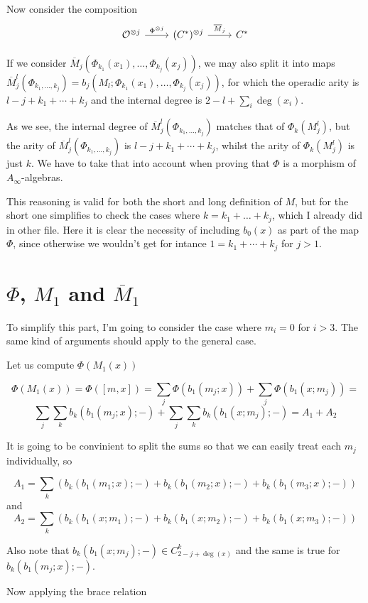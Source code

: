 \documentclass[twoside]{article}
\begin{document}
Now consider the composition
\[
\begin{tikzcd}
\OO^{\otimes j}\arrow[r,"\Phi^{\otimes j}"] &(C^*)^{\otimes j}\arrow[r, "\overline{M}_j"] & C^*
\end{tikzcd}
\]

If we consider $\overline{M}_j(\Phi_{k_1}(x_1),\dots, \Phi_{k_j}(x_j))$, we may also split it into maps $\overline{M}_j^l(\Phi_{k_1,\dots, k_j})=b_j(M_l;\Phi_{k_1}(x_1),\dots, \Phi_{k_j}(x_j))$, for which the operadic arity is $l-j+k_1+\cdots+k_j$ and the internal degree is $2-l+\sum_i\deg(x_i)$. 

As we see, the internal degree of $\overline{M}_j^l(\Phi_{k_1,\dots, k_j})$ matches that of $\Phi_k(M_j^l)$, but the arity of $\overline{M}_j^l(\Phi_{k_1,\dots, k_j})$ is $l-j+k_1+\cdots+k_j$, whilst the arity of $\Phi_k(M_j^l)$ is just $k$. We have to take that into account when proving that $\Phi$ is a morphism of $A_\infty$-algebras.

This reasoning is valid for both the short and long definition of $M$, but for the short one simplifies to check the cases where $k=k_1+\dots+k_j$, which I already did in other file. Here it is clear the necessity of including $b_0(x)$ as part of the map $\Phi$, since otherwise we wouldn't get for intance $1=k_1+\cdots+k_j$ for $j>1$. 

\section{$\Phi$, $M_1$ and $\overline{M}_1$}

To simplify this part, I'm going to consider the case where $m_i=0$ for $i>3$. The same kind of arguments should apply to the general case.

Let us compute $\Phi(M_1(x))$ 

$$\Phi(M_1(x))=\Phi([m,x])=\sum_j\Phi(b_1(m_j;x))+\sum_j\Phi(b_1(x;m_j))=$$
$$\sum_j\sum_k b_k(b_1(m_j;x);-)+\sum_j\sum_k b_k(b_1(x;m_j);-)=A_1+A_2$$

It is going to be convinient to split the sums so that we can easily treat each $m_j$ individually, so

$$A_1=\sum_k (b_k(b_1(m_1;x);-)+b_k(b_1(m_2;x);-)+b_k(b_1(m_3;x);-))$$
and
$$A_2=\sum_k (b_k(b_1(x;m_1);-)+b_k(b_1(x;m_2);-)+b_k(b_1(x;m_3);-))$$

Also note that $b_k(b_1(x;m_j);-)\in C^k_{2-j+\deg(x)}$ and the same is true for $b_k(b_1(m_j;x);-)$.

Now applying the brace relation
\end{document}
